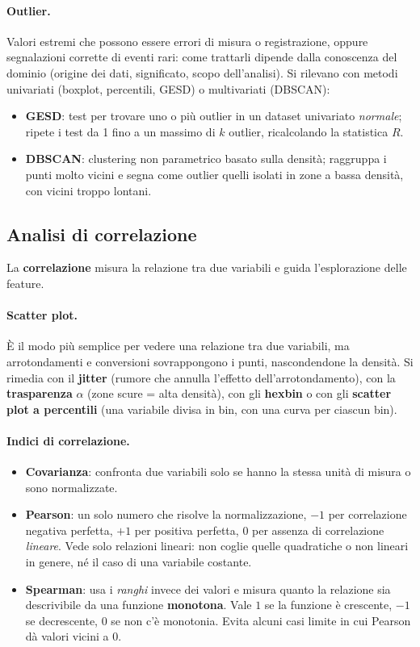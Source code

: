 \paragraph*{Outlier.}
Valori estremi che possono essere errori di misura o registrazione, oppure segnalazioni corrette di eventi rari: come trattarli dipende dalla conoscenza del dominio (origine dei dati, significato, scopo dell'analisi). Si rilevano con metodi univariati (boxplot, percentili, GESD) o multivariati (DBSCAN):
\begin{itemize}
    \item \textbf{GESD}: test per trovare uno o più outlier in un dataset univariato \emph{normale}; ripete i test da 1 fino a un massimo di $k$ outlier, ricalcolando la statistica $R$.
    \item \textbf{DBSCAN}: clustering non parametrico basato sulla densità; raggruppa i punti molto vicini e segna come outlier quelli isolati in zone a bassa densità, con vicini troppo lontani.
\end{itemize}

\subsection*{Analisi di correlazione}

La \textbf{correlazione} misura la relazione tra due variabili e guida l'esplorazione delle feature.

\paragraph*{Scatter plot.}
È il modo più semplice per vedere una relazione tra due variabili, ma arrotondamenti e conversioni sovrappongono i punti, nascondendone la densità. Si rimedia con il \textbf{jitter} (rumore che annulla l'effetto dell'arrotondamento), con la \textbf{trasparenza} $\alpha$ (zone scure = alta densità), con gli \textbf{hexbin} o con gli \textbf{scatter plot a percentili} (una variabile divisa in bin, con una curva per ciascun bin).

\paragraph*{Indici di correlazione.}
\begin{itemize}
    \item \textbf{Covarianza}: confronta due variabili solo se hanno la stessa unità di misura o sono normalizzate.
    \item \textbf{Pearson}: un solo numero che risolve la normalizzazione, $-1$ per correlazione negativa perfetta, $+1$ per positiva perfetta, $0$ per assenza di correlazione \emph{lineare}. Vede solo relazioni lineari: non coglie quelle quadratiche o non lineari in genere, né il caso di una variabile costante.
    \item \textbf{Spearman}: usa i \emph{ranghi} invece dei valori e misura quanto la relazione sia descrivibile da una funzione \textbf{monotona}. Vale $1$ se la funzione è crescente, $-1$ se decrescente, $0$ se non c'è monotonia. Evita alcuni casi limite in cui Pearson dà valori vicini a 0.
\end{itemize}

